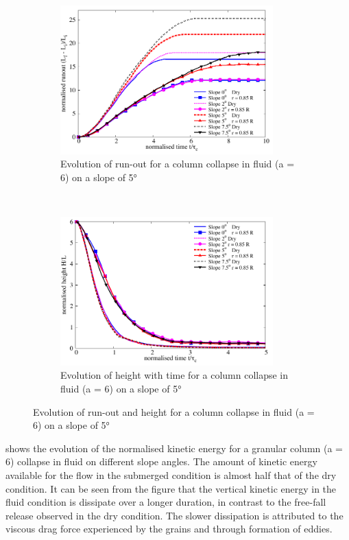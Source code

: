 \begin{figure}
\centering
\begin{subfigure}[t]{0.9\textwidth}
\includegraphics[width=0.9\textwidth]{Runout_a6_slope}
\caption{Evolution of run-out for a column collapse in fluid (a = 6) on a 
slope of 5\si{\degree}}
\label{fig:Runout_a6_slope}
\end{subfigure} \\
\begin{subfigure}[t]{0.9\textwidth}
\centering
\includegraphics[width=0.9\textwidth]{Height_a6_slope}
\caption{Evolution of height with time for a column collapse in fluid (a = 6) 
on a slope of 5\si{\degree}}
\label{fig:Height_a6_slope}
\end{subfigure}
\caption{Evolution of  run-out and height  for a column collapse in fluid (a = 
6) on a slope of 5\si{\degree}}
\label{fig:a6_slope}
\end{figure}

 shows the evolution of the normalised kinetic energy 
for a granular column (a = 6) collapse in fluid on different slope angles. The 
amount of kinetic energy available for the flow in the submerged condition 
is almost half that of the dry condition. It can be seen from the figure that 
the vertical kinetic energy in the fluid condition is dissipate over a longer 
duration, in contrast to the free-fall release observed in the dry condition. 
The slower dissipation is attributed to the viscous drag force experienced by 
the grains and through formation of eddies. 

